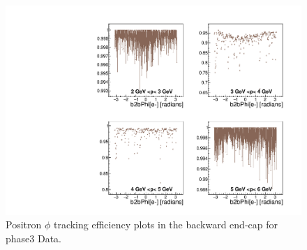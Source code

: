 \documentclass[a4paper,11pt,twosided,final,german,openbib,pdftex,listof=totoc,bibliography=totoc]{scrbook}
\begin{document}
\begin{appendix}
\begin{figure}[!htbp]
	\centering
	\includegraphics[width=\textwidth]{Plots/master3/xPMPhiepEC_DataP3}
	\caption[Momentum $\phi$ Positron Backward End-Cap Efficiency Phase3 Data]{Positron $\phi$ tracking efficiency plots in the backward end-cap for phase3 Data.}
	\label{plt:PMPhiepEC3_Data}
\end{figure}

\clearpage



\end{appendix}
\end{document}
